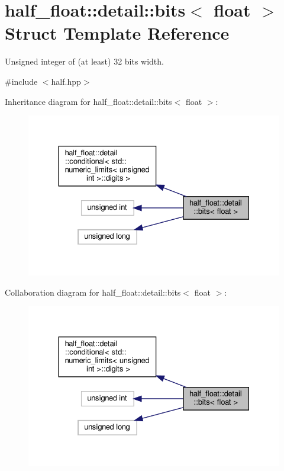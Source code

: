 \hypertarget{structhalf__float_1_1detail_1_1bits_3_01float_01_4}{}\section{half\+\_\+float\+:\+:detail\+:\+:bits$<$ float $>$ Struct Template Reference}
\label{structhalf__float_1_1detail_1_1bits_3_01float_01_4}


Unsigned integer of (at least) 32 bits width.  




{\ttfamily \#include $<$half.\+hpp$>$}



Inheritance diagram for half\+\_\+float\+:\+:detail\+:\+:bits$<$ float $>$\+:
\nopagebreak
\begin{figure}[H]
\begin{center}
\leavevmode
\includegraphics[width=330pt]{structhalf__float_1_1detail_1_1bits_3_01float_01_4__inherit__graph}
\end{center}
\end{figure}


Collaboration diagram for half\+\_\+float\+:\+:detail\+:\+:bits$<$ float $>$\+:
\nopagebreak
\begin{figure}[H]
\begin{center}
\leavevmode
\includegraphics[width=330pt]{structhalf__float_1_1detail_1_1bits_3_01float_01_4__coll__graph}
\end{center}
\end{figure}
